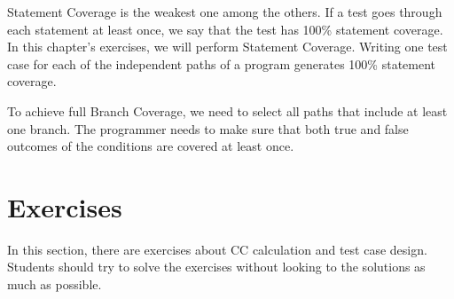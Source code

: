 Statement Coverage is the weakest one among the others. If a test goes through each statement at least once, we say that the test has 100\% statement coverage. In this chapter's exercises, we will perform Statement Coverage. Writing one test case for each of the independent paths of a program generates 100\% statement coverage.

To achieve full Branch Coverage, we need to select all paths that include at least one branch. The programmer needs to make sure that both true and false outcomes of the conditions are covered at least once.

\section{Exercises}
In this section, there are exercises about CC calculation and test case design. Students should try to solve the exercises without looking to the solutions as much as possible.


